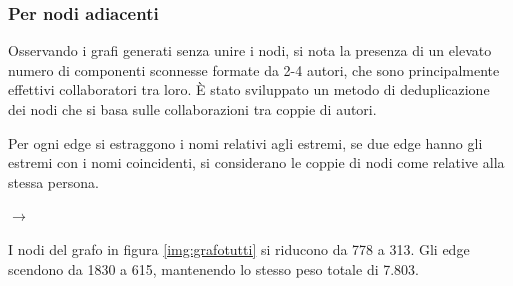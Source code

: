 \documentclass[12pt,a4paper,twoside]{report}
\begin{document}

\clearpage %

\subsubsection{Per nodi adiacenti} \label{ssc:edge}
Osservando i grafi generati senza unire i nodi, si nota la presenza di un elevato numero di
componenti sconnesse formate da 2-4 autori, che sono principalmente effettivi collaboratori tra
loro. È stato sviluppato un metodo di deduplicazione dei nodi che si basa sulle collaborazioni tra
coppie di autori.

Per ogni edge si estraggono i nomi relativi agli estremi, se due edge hanno gli estremi con i nomi
coincidenti, si considerano le coppie di nodi come relative alla stessa persona.

\begin{center}
\begin{minipage}{0.40\textwidth}
\end{minipage}
\begin{minipage}{0.075\textwidth}
$\rightarrow$
\end{minipage}
\begin{minipage}{0.40\textwidth}
\end{minipage}
\end{center}

I nodi del grafo in figura \ref{img:grafotutti} si riducono da 778 a 313. Gli edge scendono da 1830
a 615, mantenendo lo stesso peso totale di 7.803.
\end{document}
